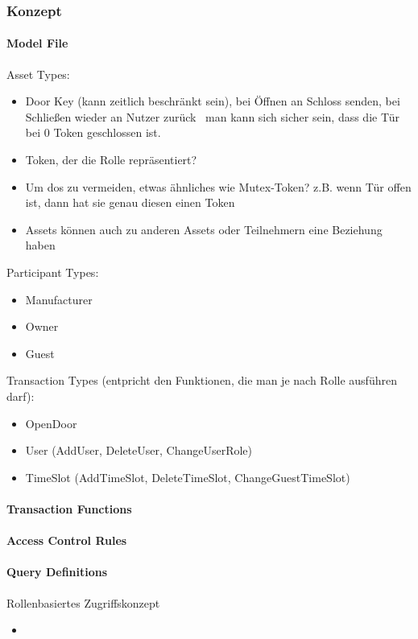     \subsubsection{Konzept}
    
    \paragraph{Model File}
        Asset Types:
        \begin{itemize}[noitemsep]
            \item Door Key (kann zeitlich beschränkt sein), bei Öffnen an Schloss senden, bei Schließen wieder an Nutzer zurück \textrightarrow\ man kann sich sicher sein, dass die Tür bei 0 Token geschlossen ist.
            \item Token, der die Rolle repräsentiert?
            \item Um \gls{dos} zu vermeiden, etwas ähnliches wie Mutex-Token? z.B. wenn Tür offen ist, dann hat sie genau diesen einen Token
            \item Assets können auch zu anderen Assets oder Teilnehmern eine Beziehung haben\cite{ComposerDocs}
        \end{itemize}
        
        Participant Types:
        \begin{itemize}[noitemsep]
            \item Manufacturer
            \item Owner
            \item Guest
        \end{itemize}
        
        Transaction Types (entpricht den Funktionen, die man je nach Rolle ausführen darf):
        \begin{itemize}[noitemsep]
            \item OpenDoor
            \item User (AddUser, DeleteUser, ChangeUserRole)
            \item TimeSlot (AddTimeSlot, DeleteTimeSlot, ChangeGuestTimeSlot)
        \end{itemize}
    
    \paragraph{Transaction Functions}
    
    \paragraph{Access Control Rules}
    
    \paragraph{Query Definitions}
    
    Rollenbasiertes Zugriffskonzept
    \begin{itemize}[noitemsep]
        \item 
    \end{itemize}